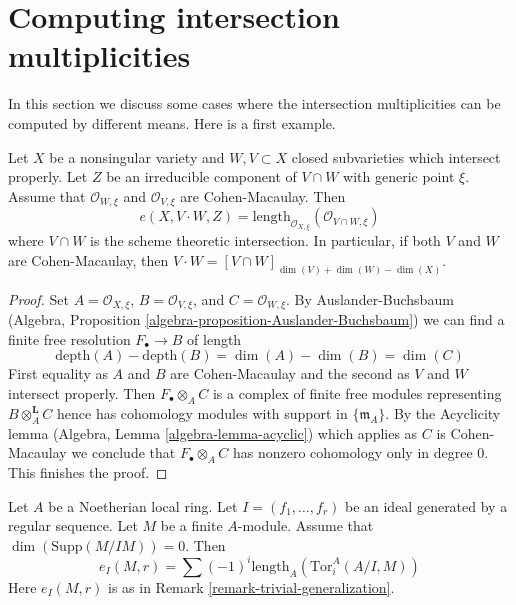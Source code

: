 \section{Computing intersection multiplicities}
\label{section-computing-intersection-multiplicities}

\noindent
In this section we discuss some cases where the intersection multiplicities
can be computed by different means. Here is a first example.

\begin{lemma}
\label{lemma-intersection-multiplicity-CM}
Let $X$ be a nonsingular variety and $W, V \subset X$ closed
subvarieties which intersect properly. Let $Z$ be an irreducible component
of $V \cap W$ with generic point $\xi$. Assume that $\mathcal{O}_{W, \xi}$
and $\mathcal{O}_{V, \xi}$ are Cohen-Macaulay. Then
$$
e(X, V \cdot W, Z) =
\text{length}_{\mathcal{O}_{X, \xi}}(\mathcal{O}_{V \cap W, \xi})
$$
where $V \cap W$ is the scheme theoretic intersection.
In particular, if both $V$ and $W$ are Cohen-Macaulay, then
$V \cdot W = [V \cap W]_{\dim(V) + \dim(W) - \dim(X)}$.
\end{lemma}

\begin{proof}
Set $A = \mathcal{O}_{X, \xi}$, $B = \mathcal{O}_{V, \xi}$, and
$C = \mathcal{O}_{W, \xi}$. By Auslander-Buchsbaum
(Algebra, Proposition \ref{algebra-proposition-Auslander-Buchsbaum})
we can find a finite free resolution $F_\bullet \to B$ of
length
$$
\text{depth}(A) - \text{depth}(B) =
\dim(A) - \dim(B) = \dim(C)
$$
First equality as $A$ and $B$ are Cohen-Macaulay and the second
as $V$ and $W$ intersect properly. Then $F_\bullet \otimes_A C$ is a
complex of finite free modules representing $B \otimes_A^\mathbf{L} C$
hence has cohomology modules with support in $\{\mathfrak m_A\}$.
By the Acyclicity lemma (Algebra, Lemma \ref{algebra-lemma-acyclic})
which applies as $C$ is Cohen-Macaulay
we conclude that $F_\bullet \otimes_A C$ has nonzero
cohomology only in degree $0$. This finishes the proof.
\end{proof}

\begin{lemma}
\label{lemma-one-ideal-ci}
Let $A$ be a Noetherian local ring. Let $I = (f_1, \ldots, f_r)$ be an ideal
generated by a regular sequence. Let $M$ be a finite $A$-module. Assume that
$\dim(\text{Supp}(M/IM)) = 0$. Then
$$
e_I(M, r) = \sum (-1)^i\text{length}_A(\text{Tor}_i^A(A/I, M))
$$
Here $e_I(M, r)$ is as in Remark \ref{remark-trivial-generalization}.
\end{lemma}


